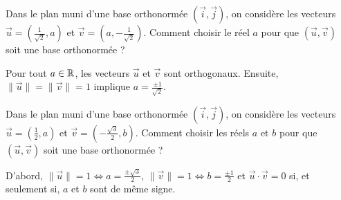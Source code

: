 \begin{question}
Dans le plan muni d'une base orthonormée $(\vec{i},\vec{j})$, on considère les vecteurs $\displaystyle \vec{u}=\left(\frac{1}{\sqrt{2}},a\right)$ et $\displaystyle \vec{v}=\left(a,-\frac{1}{\sqrt{2}}\right)$. Comment choisir le réel $a$ pour que $(\vec{u},\vec{v})$ soit une base orthonormée ?
\begin{answers}  
\end{answers}
\begin{explanations}
Pour tout $a\in \mathbb{R}$, les vecteurs $\vec{u}$ et $\vec{v}$ sont orthogonaux. Ensuite, $\|\vec{u}\|=\|\vec{v}\|=1$ implique $\displaystyle a=\frac{\pm 1}{\sqrt{2}}$.
\end{explanations}
\end{question}



\begin{question}
Dans le plan muni d'une base orthonormée $(\vec{i},\vec{j})$, on considère les vecteurs $\displaystyle \vec{u}=\left(\frac{1}{2},a\right)$ et $\displaystyle \vec{v}=\left(-\frac{\sqrt{3}}{2},b\right)$. Comment choisir les réels $a$ et $b$ pour que $(\vec{u},\vec{v})$ soit une base orthonormée ?
\begin{answers}  
\end{answers}
\begin{explanations}
D'abord, $\displaystyle \|\vec{u}\|=1\Leftrightarrow a=\frac{\pm \sqrt{3}}{2}$, $\displaystyle \|\vec{v}\|=1\Leftrightarrow b=\frac{\pm 1}{2}$ et $\vec{u}\cdot\vec{v}=0$ si, et seulement si, $a$ et $b$ sont de même signe.
\end{explanations}
\end{question}


